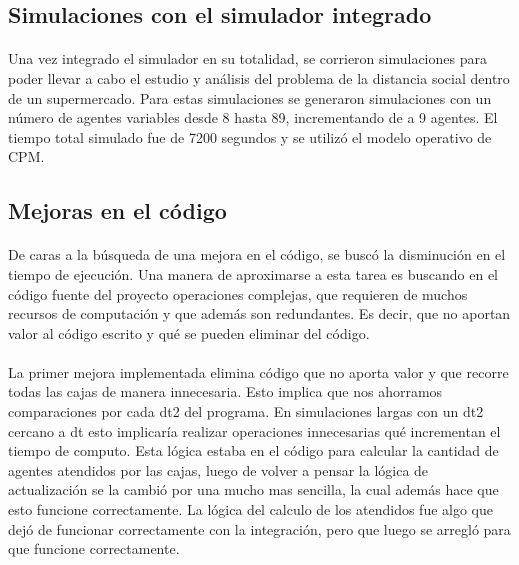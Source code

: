 \documentclass{article}
\begin{document}
\subsection{Simulaciones con el simulador integrado}

\paragraph{}
Una vez integrado el simulador en su totalidad, se corrieron simulaciones para poder llevar a cabo el estudio y análisis del problema de la distancia social dentro de un supermercado. Para estas simulaciones se generaron simulaciones con un número de agentes variables desde 8 hasta 89, incrementando de a 9 agentes. El tiempo total simulado fue de 7200 segundos y se utilizó el modelo operativo de CPM.

\subsection{Mejoras en el código}

\paragraph{}
De caras a la búsqueda de una mejora en el código, se buscó la disminución en el tiempo de ejecución. Una manera de aproximarse a esta tarea es buscando en el código fuente del proyecto operaciones complejas, que requieren de muchos recursos de computación y que además son redundantes. Es decir, que no aportan valor al código escrito y qué se pueden eliminar del código.

\paragraph{}
La primer mejora implementada elimina código que no aporta valor y que recorre todas las cajas de manera innecesaria. Esto implica que nos ahorramos comparaciones por cada dt2 del programa. En simulaciones largas con un dt2 cercano a dt esto implicaría realizar operaciones innecesarias qué incrementan el tiempo de computo. Esta lógica estaba en el código para calcular la cantidad de agentes atendidos por las cajas, luego de volver a pensar la lógica de actualización se la cambió por una mucho mas sencilla, la cual además hace que esto funcione correctamente. La lógica del calculo de los atendidos fue algo que dejó de funcionar correctamente con la integración, pero que luego se arregló para que funcione correctamente.
\end{document}
